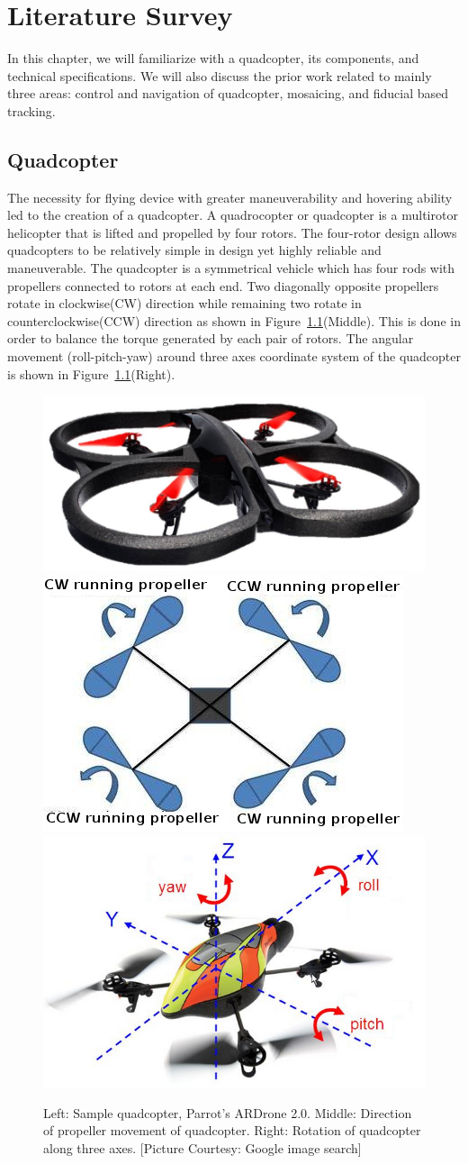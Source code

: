 \chapter{Literature Survey}
\label{ch:quadcopter}
In this chapter, we will familiarize with a quadcopter, its components, and
technical specifications. We will also discuss the prior work related to
mainly three areas: control and navigation of quadcopter, mosaicing, and
fiducial based tracking. 
\section{Quadcopter}
The necessity for flying device with greater maneuverability and hovering
ability led to the creation of a quadcopter. A quadrocopter or quadcopter  is a
multirotor helicopter that is lifted and propelled by four rotors. The
four-rotor design allows quadcopters to be relatively simple in design yet
highly reliable and maneuverable. The quadcopter  is a  symmetrical vehicle which
has four rods with propellers connected to rotors  at each end. Two diagonally
opposite propellers rotate in clockwise(CW) direction while remaining  two
rotate in counterclockwise(CCW) direction as shown in
Figure~\ref{fig:quadcopter}(Middle). This is done in order to balance the
torque generated by each pair of rotors. The angular movement (roll-pitch-yaw)
around three axes coordinate system of the quadcopter is shown in
Figure~\ref{fig:quadcopter}(Right).


\begin{figure}[b!]
  \includegraphics[width=0.3\linewidth]{images/ardrone2}	
  \includegraphics[width=0.34\linewidth]{images/quadrotor}
  \includegraphics[width=0.34\linewidth]{images/rpy}
  \caption[Quadcopter Motions]{Left: Sample quadcopter, Parrot's ARDrone 2.0.
  Middle: Direction of propeller movement of quadcopter. Right: Rotation of
  quadcopter along three axes. [Picture Courtesy: Google image search]}
  \label{fig:quadcopter}
\end{figure}

